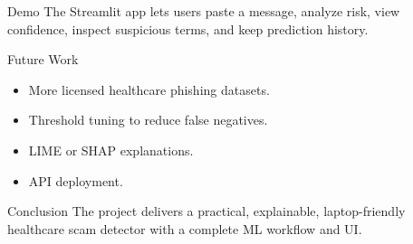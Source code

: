 \documentclass{beamer}
\begin{document}
\begin{frame}{Demo}
The Streamlit app lets users paste a message, analyze risk, view confidence, inspect suspicious terms, and keep prediction history.
\end{frame}

\begin{frame}{Future Work}
\begin{itemize}
\item More licensed healthcare phishing datasets.
\item Threshold tuning to reduce false negatives.
\item LIME or SHAP explanations.
\item API deployment.
\end{itemize}
\end{frame}

\begin{frame}{Conclusion}
The project delivers a practical, explainable, laptop-friendly healthcare scam detector with a complete ML workflow and UI.
\end{frame}
\end{document}
